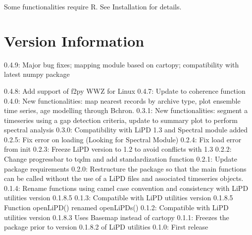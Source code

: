 \documentclass[letterpaper,10pt,english]{sphinxmanual}
\begin{document}
Some functionalities require R. See Installation for details.


\section{Version Information}
\label{\detokenize{Introduction:version-information}}

\begin{DUlineblock}{0em}
\item[] 0.4.9: Major bug fixes; mapping module based on cartopy; compatibility with latest numpy package
\end{DUlineblock}

\textbar{} 0.4.8: Add support of f2py WWZ for Linux
\textbar{} 0.4.7: Update to coherence function
\textbar{} 0.4.0: New functionalities: map nearest records by archive type, plot ensemble time series, age modelling through Bchron.
\textbar{} 0.3.1: New functionalities: segment a timeseries using a gap detection criteria, update to summary plot to perform spectral analysis
\textbar{} 0.3.0: Compatibility with LiPD 1.3 and Spectral module added
\textbar{} 0.2.5: Fix error on loading (Looking for Spectral Module)
\textbar{} 0.2.4: Fix load error from init
\textbar{} 0.2.3: Freeze LiPD version to 1.2 to avoid conflicts with 1.3
\textbar{} 0.2.2: Change progressbar to tqdm and add standardization function
\textbar{} 0.2.1: Update package requirements
\textbar{} 0.2.0: Restructure the package so that the main functions can be called without the use of a LiPD files and associated timeseries objects.
\textbar{} 0.1.4: Rename functions using camel case convention and consistency with LiPD utilities version 0.1.8.5
\textbar{} 0.1.3: Compatible with LiPD utilities version 0.1.8.5
\textbar{}        Function openLiPD() renamed openLiPDs()
\textbar{} 0.1.2: Compatible with LiPD utilities version 0.1.8.3
\textbar{}        Uses Basemap instead of cartopy
\textbar{} 0.1.1: Freezes the package prior to version 0.1.8.2 of LiPD utilities
\textbar{} 0.1.0: First release
\end{document}

